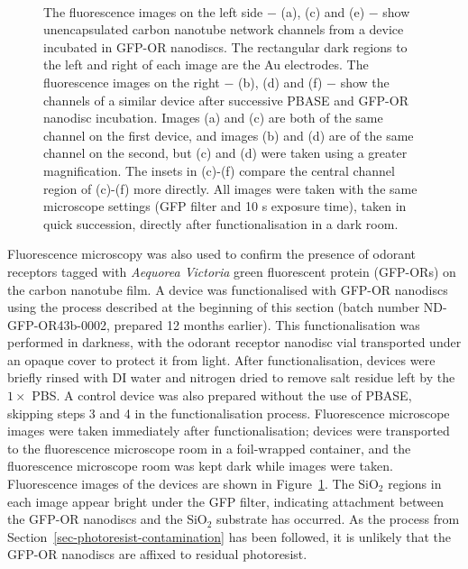 \documentclass[
  a4paper,
]{scrbook}
\begin{document}
\begin{figure}
\begin{minipage}[t]{0.45\linewidth}
{{}

}

\end{minipage}%
%
\begin{minipage}[t]{0.01\linewidth}

{\centering 

~

}

\end{minipage}%

\caption[Fluorescence images showing unencapsulated carbon nanotube
network channels from a device incubated in GFP-OR nanodiscs, with or
without initial incubation in PBASE.]{\label{fig-PBASE-GFP-ORs}The
fluorescence images on the left side \(-\) (a), (c) and (e) \(-\) show
unencapsulated carbon nanotube network channels from a device incubated
in GFP-OR nanodiscs. The rectangular dark regions to the left and right
of each image are the Au electrodes. The fluorescence images on the
right \(-\) (b), (d) and (f) \(-\) show the channels of a similar device
after successive PBASE and GFP-OR nanodisc incubation. Images (a) and
(c) are both of the same channel on the first device, and images (b) and
(d) are of the same channel on the second, but (c) and (d) were taken
using a greater magnification. The insets in (c)-(f) compare the central
channel region of (c)-(f) more directly. All images were taken with the
same microscope settings (GFP filter and 10 s exposure time), taken in
quick succession, directly after functionalisation in a dark room.}

\end{figure}

Fluorescence microscopy was also used to confirm the presence of odorant
receptors tagged with \emph{Aequorea Victoria} green fluorescent protein
(GFP-ORs) on the carbon nanotube film. A device was functionalised with
GFP-OR nanodiscs using the process described at the beginning of this
section (batch number ND-GFP-OR43b-0002, prepared 12 months earlier).
This functionalisation was performed in darkness, with the odorant
receptor nanodisc vial transported under an opaque cover to protect it
from light. After functionalisation, devices were briefly rinsed with DI
water and nitrogen dried to remove salt residue left by the \(1 \times\)
PBS. A control device was also prepared without the use of PBASE,
skipping steps 3 and 4 in the functionalisation process. Fluorescence
microscope images were taken immediately after functionalisation;
devices were transported to the fluorescence microscope room in a
foil-wrapped container, and the fluorescence microscope room was kept
dark while images were taken. Fluorescence images of the devices are
shown in Figure~\ref{fig-PBASE-GFP-ORs}. The SiO\(_2\) regions in each
image appear bright under the GFP filter, indicating attachment between
the GFP-OR nanodiscs and the SiO\(_2\) substrate has occurred. As the
process from Section~\ref{sec-photoresist-contamination} has been
followed, it is unlikely that the GFP-OR nanodiscs are affixed to
residual photoresist.
\end{document}
